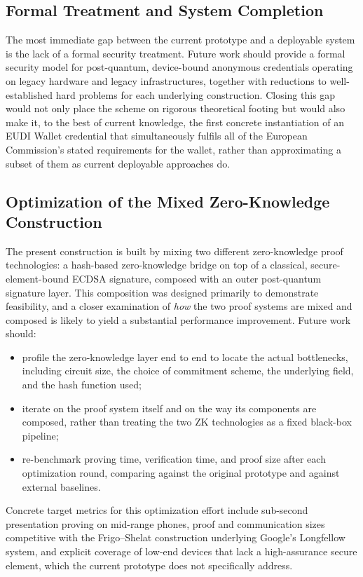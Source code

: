\documentclass{article}
\begin{document}
\subsection{Formal Treatment and System Completion}

The most immediate gap between the current prototype and a deployable system is the lack of a formal security treatment. Future work should provide a formal security model for post-quantum, device-bound anonymous credentials operating on legacy hardware and legacy infrastructures, together with reductions to well-established hard problems for each underlying construction. Closing this gap would not only place the scheme on rigorous theoretical footing but would also make it, to the best of current knowledge, the first concrete instantiation of an EUDI Wallet credential that simultaneously fulfils all of the European Commission's stated requirements for the wallet, rather than approximating a subset of them as current deployable approaches do.

\subsection{Optimization of the Mixed Zero-Knowledge Construction}

The present construction is built by mixing two different zero-knowledge proof technologies: a hash-based zero-knowledge bridge on top of a classical, secure-element-bound ECDSA signature, composed with an outer post-quantum signature layer. This composition was designed primarily to demonstrate feasibility, and a closer examination of \emph{how} the two proof systems are mixed and composed is likely to yield a substantial performance improvement. Future work should:
\begin{itemize}
    \item profile the zero-knowledge layer end to end to locate the actual bottlenecks, including circuit size, the choice of commitment scheme, the underlying field, and the hash function used;
    \item iterate on the proof system itself and on the way its components are composed, rather than treating the two ZK technologies as a fixed black-box pipeline;
    \item re-benchmark proving time, verification time, and proof size after each optimization round, comparing against the original prototype and against external baselines.
\end{itemize}
Concrete target metrics for this optimization effort include sub-second presentation proving on mid-range phones, proof and communication sizes competitive with the Frigo--Shelat construction underlying Google's Longfellow system, and explicit coverage of low-end devices that lack a high-assurance secure element, which the current prototype does not specifically address.
\end{document}
